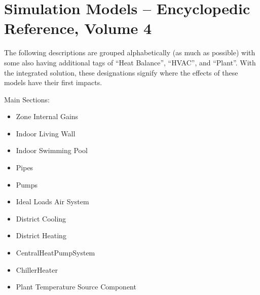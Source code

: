 \chapter{Simulation Models -- Encyclopedic Reference, Volume 4}\label{simulation-models---encyclopedic-reference-003}

The following descriptions are grouped alphabetically (as much as possible) with some also having additional tags of ``Heat Balance'', ``HVAC'', and ``Plant''. With the integrated solution, these designations signify where the effects of these models have their first impacts.

Main Sections:

\begin{itemize}
  \tightlist
  \item Zone Internal Gains
  \item Indoor Living Wall
  \item Indoor Swimming Pool
  \item Pipes
  \item Pumps
  \item Ideal Loads Air System
  \item District Cooling
  \item District Heating
  \item CentralHeatPumpSystem
  \item ChillerHeater
  \item Plant Temperature Source Component
\end{itemize}
